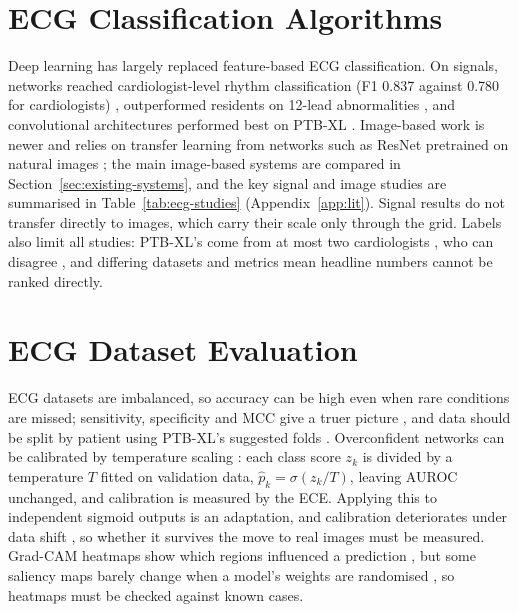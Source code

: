 \section{ECG Classification Algorithms}
\label{sec:ml-ecg}

Deep learning has largely replaced feature-based ECG classification. On signals, networks reached cardiologist-level rhythm classification (F1 0.837 against 0.780 for cardiologists) \cite{hannun_cardiologist_2019}, outperformed residents on 12-lead abnormalities \cite{ribeiro_automatic_2020}, and convolutional architectures performed best on PTB-XL \cite{strodthoff_deep_2021}. Image-based work is newer and relies on transfer learning from networks such as ResNet pretrained on natural images \cite{he_deep_2016,yosinski_transfer_2014}; the main image-based systems are compared in Section~\ref{sec:existing-systems}, and the key signal and image studies are summarised in Table~\ref{tab:ecg-studies} (Appendix~\ref{app:lit}). Signal results do not transfer directly to images, which carry their scale only through the grid. Labels also limit all studies: PTB-XL's come from at most two cardiologists \cite{wagner_ptbxl_2020}, who can disagree \cite{dhutia_interrater_2017}, and differing datasets and metrics mean headline numbers cannot be ranked directly.

\section{ECG Dataset Evaluation}
\label{sec:ml-eval}

ECG datasets are imbalanced, so accuracy can be high even when rare conditions are missed; sensitivity, specificity and MCC give a truer picture \cite{chicco_advantages_2020}, and data should be split by patient using PTB-XL's suggested folds \cite{wagner_ptbxl_2020}. Overconfident networks can be calibrated by temperature scaling \cite{guo_calibration_2017}: each class score $z_k$ is divided by a temperature $T$ fitted on validation data, $\hat{p}_k = \sigma(z_k/T)$, leaving AUROC unchanged, and calibration is measured by the ECE. Applying this to independent sigmoid outputs is an adaptation, and calibration deteriorates under data shift \cite{ovadia_trust_2019}, so whether it survives the move to real images must be measured. Grad-CAM heatmaps show which regions influenced a prediction \cite{selvaraju_gradcam_2017}, but some saliency maps barely change when a model's weights are randomised \cite{adebayo_sanity_2018}, so heatmaps must be checked against known cases.

